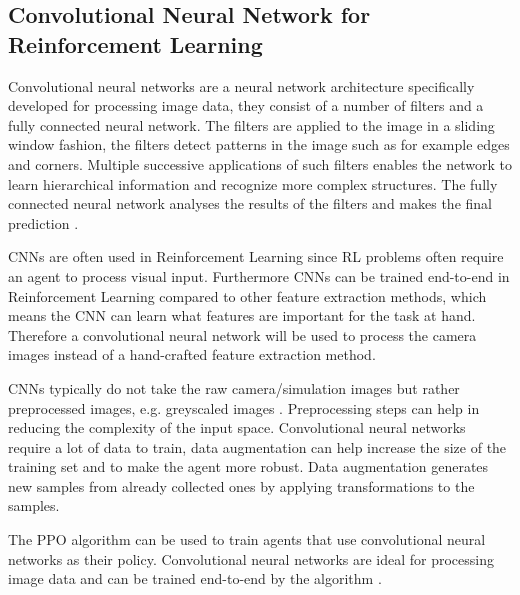 


\subsection*{Convolutional Neural Network for Reinforcement Learning}

Convolutional neural networks are a neural network architecture specifically developed for processing image data, they consist of a number of filters and a fully connected neural network. The filters are applied to the image in a sliding window fashion, the filters detect patterns in the image such as for example edges and corners. Multiple successive applications of such filters enables the network to learn hierarchical information and recognize more complex structures. The fully connected neural network analyses the results of the filters and makes the final prediction \textcite{rlbook2020}.

CNNs are often used in Reinforcement Learning since RL problems often require an agent to process visual input. Furthermore CNNs can be trained end-to-end in Reinforcement Learning compared to other feature extraction methods, which means the CNN can learn what features are important for the task at hand.
Therefore a convolutional neural network will be used to process the camera images instead of a hand-crafted feature extraction method. 

CNNs typically do not take the raw camera/simulation images but rather preprocessed images, e.g. greyscaled images \textcite{atari}. Preprocessing steps can help in reducing the complexity of the input space. Convolutional neural networks require a lot of data to train, data augmentation can help increase the size of the training set and to make the agent more robust. Data augmentation generates new samples from already collected ones by applying transformations to the samples. 


The PPO algorithm can be used to train agents that use convolutional neural networks as their policy. Convolutional neural networks are ideal for processing image data and can be trained end-to-end by the algorithm \textcite{ppo}. 

